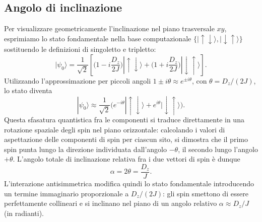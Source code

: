 \documentclass[11pt,a4paper]{article}
\begin{document}
\subsection{Angolo di inclinazione}

Per visualizzare geometricamente l'inclinazione nel piano trasversale $xy$, esprimiamo
lo stato fondamentale nella base computazionale $\{|\!\uparrow\downarrow\rangle,|\!\downarrow\uparrow\rangle\}$
sostituendo le definizioni di singoletto e tripletto:
$$|\psi_0\rangle = \frac1{\sqrt2}\left[\Big(1-i\frac{D_z}{2J}\Big)|\!\uparrow\downarrow\rangle + \Big(1+i\frac{D_z}{2J}\Big)|\!\downarrow\uparrow\rangle\right].$$
Utilizzando l'approssimazione per piccoli angoli $1\pm i\theta\approx e^{\pm i\theta}$,
con $\theta=D_z/(2J)$, lo stato diventa
$$|\psi_0\rangle \approx \frac1{\sqrt2}\Big(e^{-i\theta}|\!\uparrow\downarrow\rangle + e^{i\theta}|\!\downarrow\uparrow\rangle\Big).$$
Questa sfasatura quantistica fra le componenti si traduce direttamente in una
rotazione spaziale degli spin nel piano orizzontale: calcolando i valori di
aspettazione delle componenti di spin per ciascun sito, si dimostra che il primo spin
punta lungo la direzione individuata dall'angolo $-\theta$, il secondo lungo l'angolo
$+\theta$. L'angolo totale di inclinazione relativa fra i due vettori di spin \`e
dunque
$$\alpha = 2\theta = \frac{D_z}{J}.$$
L'interazione antisimmetrica modifica quindi lo stato fondamentale introducendo un
termine immaginario proporzionale a $D_z/(2J)$: gli spin smettono di essere
perfettamente collineari e si inclinano nel piano di un angolo relativo
$\alpha\approx D_z/J$ (in radianti).

\begin{center}
\end{center}
\end{document}
